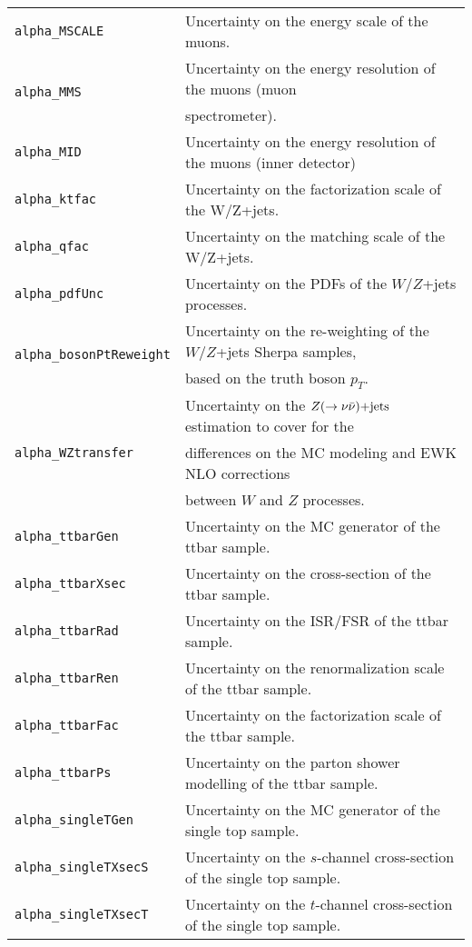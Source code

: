 \begin{table}
\begin{center}
\begin{scriptsize}
\begin{tabular}{|l|l|}
\texttt{alpha\_MSCALE}       & Uncertainty on the energy scale of the muons. \\ 
\multirow{2}{*}{\texttt{alpha\_MMS}}          & Uncertainty on the energy resolution of the muons (muon \\
                    & spectrometer). \\ 
\texttt{alpha\_MID         } & Uncertainty on the energy resolution of the muons (inner detector) \\ 
\texttt{alpha\_ktfac       } & Uncertainty on the factorization scale of the W/Z+jets. \\ 
\texttt{alpha\_qfac        } & Uncertainty on the matching scale of the W/Z+jets. \\ 
\texttt{alpha\_pdfUnc      } & Uncertainty on the PDFs of the $W/Z$+jets processes. \\ 
\multirow{2}{*}{\texttt{alpha\_bosonPtReweight}}& Uncertainty on the re-weighting of the $W/Z$+jets Sherpa samples, \\
                    & based on the truth boson $p_T$. \\ 
\multirow{3}{*}{\texttt{alpha\_WZtransfer}}   & Uncertainty on the $Z(\rightarrow \nu \bar{\nu})\text{+jets}$ estimation to cover for the \\
                    & differences on the MC modeling and EWK NLO corrections \\
                    & between $W$ and $Z$ processes. \\
\texttt{alpha\_ttbarGen    } & Uncertainty on the MC generator of the ttbar sample. \\ 
\texttt{alpha\_ttbarXsec   } & Uncertainty on the cross-section of the ttbar sample. \\ 
\texttt{alpha\_ttbarRad    } & Uncertainty on the ISR/FSR of the ttbar sample. \\ 
\texttt{alpha\_ttbarRen    } & Uncertainty on the renormalization scale of the ttbar sample. \\ 
\texttt{alpha\_ttbarFac    } & Uncertainty on the factorization scale of the ttbar sample. \\ 
\texttt{alpha\_ttbarPs     } & Uncertainty on the parton shower modelling of the ttbar sample. \\ 
\texttt{alpha\_singleTGen  } & Uncertainty on the MC generator of the single top sample. \\ 
\texttt{alpha\_singleTXsecS} & Uncertainty on the $s$-channel cross-section of the single top sample. \\ 
\texttt{alpha\_singleTXsecT} & Uncertainty on the $t$-channel cross-section of the single top sample. \\ 

\end{tabular}
\end{scriptsize}
\end{center}
\end{table}

